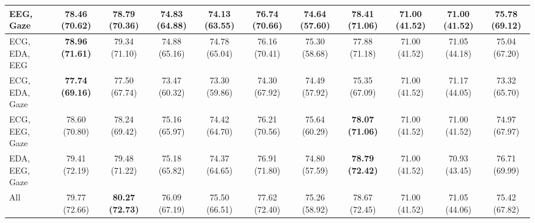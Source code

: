 \begin{table}[!htbp]
\begin{tabular}{lcccccccccc}
    EEG, Gaze & 78.46 (70.62) & 78.79 (70.36) & 74.83 (64.88) & 74.13 (63.55) & 76.74 (70.66) & 74.64 (57.60) & \textbf{78.41 (71.06)} & 71.00 (41.52) & 71.00 (41.52) & 75.78 (69.12) \\
    \midrule
    ECG, EDA, EEG & \textbf{78.96 (71.61)} & 79.34 (71.10) & 74.88 (65.16) & 74.78 (65.04) & 76.16 (70.41) & 75.30 (58.68) & 77.88 (71.18) & 71.00 (41.52) & 71.05 (44.18) & 75.04 (67.20) \\
    ECG, EDA, Gaze & \textbf{77.74 (69.16)} & 77.50 (67.74) & 73.47 (60.32) & 73.30 (59.86) & 74.30 (67.92) & 74.49 (57.92) & 75.35 (67.09) & 71.00 (41.52) & 71.17 (44.05) & 73.32 (65.70) \\
    ECG, EEG, Gaze & 78.60 (70.80) & 78.24 (69.42) & 75.16 (65.97) & 74.42 (64.70) & 76.21 (70.56) & 75.64 (60.29) & \textbf{78.07 (71.06)} & 71.00 (41.52) & 71.00 (41.52) & 74.97 (67.97) \\
    EDA, EEG, Gaze & 79.41 (72.19) & 79.48 (71.22) & 75.18 (65.82) & 74.37 (64.65) & 76.91 (71.80) & 74.80 (57.59) & \textbf{78.79 (72.42)} & 71.00 (41.52) & 70.93 (43.45) & 76.71 (69.99) \\
    \midrule
    All & 79.77 (72.66) & \textbf{80.27 (72.73)} & 76.09 (67.19) & 75.50 (66.51) & 77.62 (72.40) & 75.26 (58.92) & 78.67 (72.45) & 71.00 (41.52) & 71.05 (44.06) & 75.42 (67.82) \\
    \bottomrule
  \end{tabular}
\end{table}
